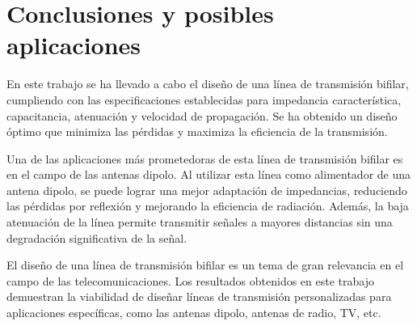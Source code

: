 \section{Conclusiones y posibles aplicaciones}

En este trabajo se ha llevado a cabo el diseño de una línea de transmisión bifilar, cumpliendo con las especificaciones establecidas para impedancia característica, capacitancia, atenuación y velocidad de propagación. Se ha obtenido un diseño óptimo que minimiza las pérdidas y maximiza la eficiencia de la transmisión.

Una de las aplicaciones más prometedoras de esta línea de transmisión bifilar es en el campo de las antenas dipolo. Al utilizar esta línea como alimentador de una antena dipolo, se puede lograr una mejor adaptación de impedancias, reduciendo las pérdidas por reflexión y mejorando la eficiencia de radiación. Además, la baja atenuación de la línea permite transmitir señales a mayores distancias sin una degradación significativa de la señal.

El diseño de una línea de transmisión bifilar es un tema de gran relevancia en el campo de las telecomunicaciones. Los resultados obtenidos en este trabajo demuestran la viabilidad de diseñar líneas de transmisión personalizadas para aplicaciones específicas, como las antenas dipolo, antenas de radio, TV, etc.



\pagebreak

